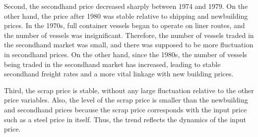 \documentclass[11pt]{article}
\begin{document}
Second, the secondhand price decreased sharply between 1974 and 1979. On the other hand, the price after 1980 was stable relative to shipping and newbuilding prices. In the 1970s, full container vessels began to operate on liner routes, and the number of vessels was insignificant. Therefore, the number of vessels traded in the secondhand market was small, and there was supposed to be more fluctuation in secondhand prices. On the other hand, since the 1980s, the number of vessels being traded in the secondhand market has increased, leading to stable secondhand freight rates and a more vital linkage with new building prices.

Third, the scrap price is stable, without any large fluctuation relative to the other price variables. Also, the level of the scrap price is smaller than the newbuilding and secondhand prices because the scrap price corresponds with the input price such as a steel price in itself. Thus, the trend reflects the dynamics of the input price.


\end{document}
